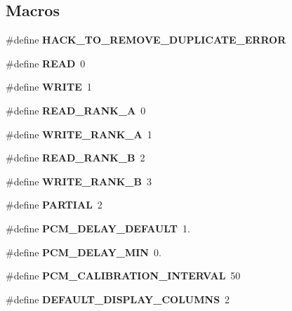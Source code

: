 \subsection*{Macros}
\begin{DoxyCompactItemize}
\item 
\mbox{\label{pcm-memory_8cpp_ac4eeb11d89b0f517835a12a04443ebe4}} 
\#define {\bfseries H\+A\+C\+K\+\_\+\+T\+O\+\_\+\+R\+E\+M\+O\+V\+E\+\_\+\+D\+U\+P\+L\+I\+C\+A\+T\+E\+\_\+\+E\+R\+R\+OR}
\item 
\mbox{\label{pcm-memory_8cpp_ada74e7db007a68e763f20c17f2985356}} 
\#define {\bfseries R\+E\+AD}~0
\item 
\mbox{\label{pcm-memory_8cpp_aa10f470e996d0f51210d24f442d25e1e}} 
\#define {\bfseries W\+R\+I\+TE}~1
\item 
\mbox{\label{pcm-memory_8cpp_a061436fedd2e4e9d6dd6166ee3a46038}} 
\#define {\bfseries R\+E\+A\+D\+\_\+\+R\+A\+N\+K\+\_\+A}~0
\item 
\mbox{\label{pcm-memory_8cpp_a25115597a19f5bd3da468c407fbd0143}} 
\#define {\bfseries W\+R\+I\+T\+E\+\_\+\+R\+A\+N\+K\+\_\+A}~1
\item 
\mbox{\label{pcm-memory_8cpp_a6d39da2a969f267aacc373b00ca94a36}} 
\#define {\bfseries R\+E\+A\+D\+\_\+\+R\+A\+N\+K\+\_\+B}~2
\item 
\mbox{\label{pcm-memory_8cpp_a6cc2ce24b2b565d91979af011a711b0a}} 
\#define {\bfseries W\+R\+I\+T\+E\+\_\+\+R\+A\+N\+K\+\_\+B}~3
\item 
\mbox{\label{pcm-memory_8cpp_abf4b6a83d9763fc6ae16c3e15dcf7a5b}} 
\#define {\bfseries P\+A\+R\+T\+I\+AL}~2
\item 
\mbox{\label{pcm-memory_8cpp_aa9ecc55c90c7a69729babc4f5f91ed96}} 
\#define {\bfseries P\+C\+M\+\_\+\+D\+E\+L\+A\+Y\+\_\+\+D\+E\+F\+A\+U\+LT}~1.
\item 
\mbox{\label{pcm-memory_8cpp_acccbe8441d6dd75bdc949f5f0ee126c5}} 
\#define {\bfseries P\+C\+M\+\_\+\+D\+E\+L\+A\+Y\+\_\+\+M\+IN}~0.
\item 
\mbox{\label{pcm-memory_8cpp_a433dde946b6713059756318598c9a6fe}} 
\#define {\bfseries P\+C\+M\+\_\+\+C\+A\+L\+I\+B\+R\+A\+T\+I\+O\+N\+\_\+\+I\+N\+T\+E\+R\+V\+AL}~50
\item 
\mbox{\label{pcm-memory_8cpp_ab5189406a4fa5221316460ceead91292}} 
\#define {\bfseries D\+E\+F\+A\+U\+L\+T\+\_\+\+D\+I\+S\+P\+L\+A\+Y\+\_\+\+C\+O\+L\+U\+M\+NS}~2
\end{DoxyCompactItemize}

